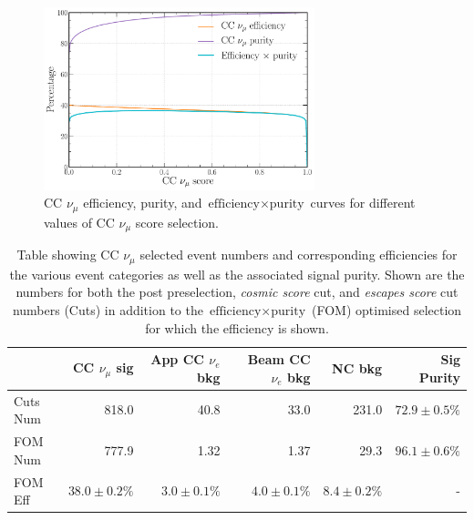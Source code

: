 \begin{figure} %
    \includegraphics[width=0.7\textwidth]{diagrams/7-results/final_numu_eff_curves.pdf}
    \caption[CC $\nu_{\mu}$ efficiency, purity, and $\text{efficiency}\times\text{purity}$ curves]
    {CC $\nu_{\mu}$ efficiency, purity, and $\text{efficiency}\times\text{purity}$ curves for
        different values of CC $\nu_{\mu}$ score selection.}
    \label{fig:final_numu_eff_curves}
\end{figure}

\begin{table}
    \begin{tabular}{lrrrrr}
                 & CC $\nu_{\mu}$ sig & App CC $\nu_{e}$ bkg & Beam CC $\nu_{e}$ bkg & NC bkg        & Sig Purity     \\
        \midrule
        Cuts Num & 818.0              & 40.8                 & 33.0                  & 231.0         & $72.9\pm0.5\%$ \\
        FOM Num  & 777.9              & 1.32                 & 1.37                  & 29.3          & $96.1\pm0.6\%$ \\
        \midrule
        FOM Eff  & $38.0\pm0.2\%$     & $3.0\pm0.1\%$        & $4.0\pm0.1\%$         & $8.4\pm0.2\%$ & -              \\
    \end{tabular}
    \caption[Table showing CC $\nu_{\mu}$ selected event numbers, efficiencies and signal purity]
    {Table showing CC $\nu_{\mu}$ selected event numbers and corresponding efficiencies for the
        various event categories as well as the associated signal purity. Shown are the numbers
        for both the post preselection, \emph{cosmic score} cut, and \emph{escapes score} cut
        numbers (Cuts) in addition to the $\text{efficiency}\times\text{purity}$ (FOM) optimised
        selection for which the efficiency is shown.}
    \label{tab:numu_selection}
\end{table}

